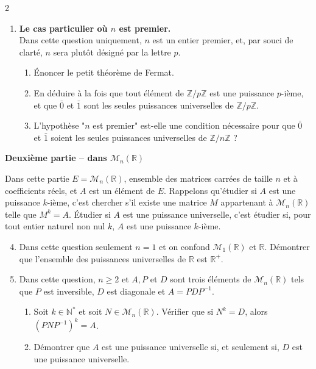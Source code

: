 \documentclass{article}
\begin{document}
\begin{paracol}{2}
{\begin{enumerate}
    \item \textbf{Le cas particulier où $n$ est premier.} \\
    Dans cette question uniquement, $n$ est un entier premier, et, par souci de clarté, $n$ sera plutôt désigné par la lettre $p$.
    \begin{enumerate}
        \item Énoncer le petit théorème de Fermat.
        \item En déduire à la fois que tout élément de $\mathbb{Z}/p\mathbb{Z}$ est une puissance $p$-ième, et que $\bar{0}$ et $\bar{1}$ sont les seules puissances universelles de $\mathbb{Z}/p\mathbb{Z}$.
        \switchcolumn
    
    \setcounter{enumi}{2}
        \item L'hypothèse "$n$ est premier" est-elle une condition nécessaire pour que $\bar{0}$ et $\bar{1}$ soient les seules puissances universelles de $\mathbb{Z}/n\mathbb{Z}$ ?
    \end{enumerate}
\end{enumerate}

\textbf{Deuxième partie – dans $\mathcal{M}_n(\mathbb{R})$}

Dans cette partie $E = \mathcal{M}_n(\mathbb{R})$, ensemble des matrices carrées de taille $n$ et à coefficients réels, et $A$ est un élément de $E$. Rappelons qu'étudier si $A$ est une puissance $k$-ième, c'est chercher s'il existe une matrice $M$ appartenant à $\mathcal{M}_n(\mathbb{R})$ telle que $M^k = A$. Étudier si $A$ est une puissance universelle, c'est étudier si, pour tout entier naturel non nul $k$, $A$ est une puissance $k$-ième.

\begin{enumerate}
    \setcounter{enumi}{3}
    \item Dans cette question seulement $n = 1$ et on confond $\mathcal{M}_1(\mathbb{R})$ et $\mathbb{R}$. Démontrer que l'ensemble des puissances universelles de $\mathbb{R}$ est $\mathbb{R}^+$.

    \item Dans cette question, $n \geq 2$ et $A, P$ et $D$ sont trois éléments de $\mathcal{M}_n(\mathbb{R})$ tels que $P$ est inversible, $D$ est diagonale et $A = PDP^{-1}$.
    \begin{enumerate}
        \item Soit $k \in \mathbb{N}^*$ et soit $N \in \mathcal{M}_n(\mathbb{R})$. Vérifier que si $N^k = D$, alors $(PNP^{-1})^k = A$.
        \item Démontrer que $A$ est une puissance universelle si, et seulement si, $D$ est une puissance universelle.
    \end{enumerate}


\end{enumerate}}
\end{paracol}
\end{document}
